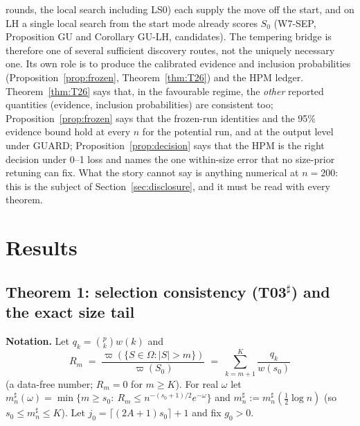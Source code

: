 \documentclass[11pt]{article}
\theoremstyle{definition}
\theoremstyle{remark}
\newcommand{\Sz}{S_0}
\begin{document}
rounds, the local search including LS0) each supply the move off the start, and on LH a single local search from the
start mode already scores $\Sz$ (W7-SEP, Proposition GU and Corollary GU-LH, candidates). The tempering bridge is therefore
one of several sufficient discovery routes, not the uniquely necessary one. Its own role is to produce the calibrated
evidence and inclusion probabilities (Proposition~\ref{prop:frozen}, Theorem~\ref{thm:T26}) and the HPM ledger.
Theorem~\ref{thm:T26} says that, in the favourable regime, the \emph{other} reported quantities (evidence, inclusion
probabilities) are consistent too; Proposition~\ref{prop:frozen} says that the frozen-run identities and the 95\%
evidence bound hold at every $n$ for the potential run, and at the output level under GUARD; Proposition~\ref{prop:decision}
says that the HPM is the right decision under 0--1 loss and names the one within-size error that no size-prior
retuning can fix. What the story cannot say is anything numerical at $n=200$: this is the subject of
Section~\ref{sec:disclosure}, and it must be read with every theorem.

\section{Results}\label{sec:results}

\subsection{Theorem 1: selection consistency (T03$^\sharp$) and the exact size tail}

\noindent\textbf{Notation.} Let $q_k=\binom pk w(k)$ and
\[
R_m\;=\;\frac{\varpi(\{S\in\Omega:|S|>m\})}{\varpi(\Sz)}\;=\;\sum_{k=m+1}^{K}\frac{q_k}{w(s_0)}
\]
(a data-free number; $R_m=0$ for $m\ge K$). For real $\omega$ let
$m^\sharp_n(\omega)=\min\{m\ge s_0:\ R_m\le n^{-(s_0+1)/2}e^{-\omega}\}$ and $m^\sharp_n:=m^\sharp_n(\tfrac12\log n)$
(so $s_0\le m^\sharp_n\le K$). Let $j_0=\lceil(2A+1)s_0\rceil+1$ and fix $g_0>0$.
\end{document}

